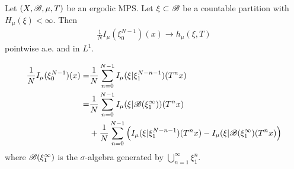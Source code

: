 \documentclass[12pt,a4paper]{report}
\newenvironment{proof}
{\begin{changemargin}{1cm}{0.5cm} 
	}%
	{\end{changemargin}
}
\begin{document}
\thm Let $(X,\mathscr{B}, \mu, T)$ be an ergodic MPS. Let $\xi \subset \mathscr{B}$ be a countable partition with $H_{\mu}(\xi) < \infty$. Then
\begin{align*}
\frac{1}{N} I_{\mu}(\xi_0^{N-1})(x) \rightarrow h_{\mu}(\xi, T)
\end{align*}
pointwise a.e. and in $L^1$.
\begin{proof}
\pf
\begin{align*}
\frac{1}{N} I_{\mu}(\xi_{0}^{N-1})(x) = &\frac{1}{N} \sum_{n=0}^{N-1} I_{\mu} (\xi | \xi_1^{N-n-1}) (T^n x) \\
= & \frac{1}{N}\sum_{n=0}^{N-1} I_{\mu}(\xi | \mathscr{B}(\xi_1^{\infty}))(T^n x) \\
& + \frac{1}{N} \sum_{n=0}^{N-1} \Big( I_{\mu}(\xi | \xi_1^{N-n-1})(T^n x) - I_{\mu}(\xi | \mathscr{B}(\xi_1^{\infty})(T^n x) \Big)
\end{align*}
where $\mathscr{B}(\xi_1^{\infty})$ is the $\sigma$-algebra generated by $\bigcup_{n=1}^{\infty} \xi_1^n$.


\end{proof}
\end{document}
